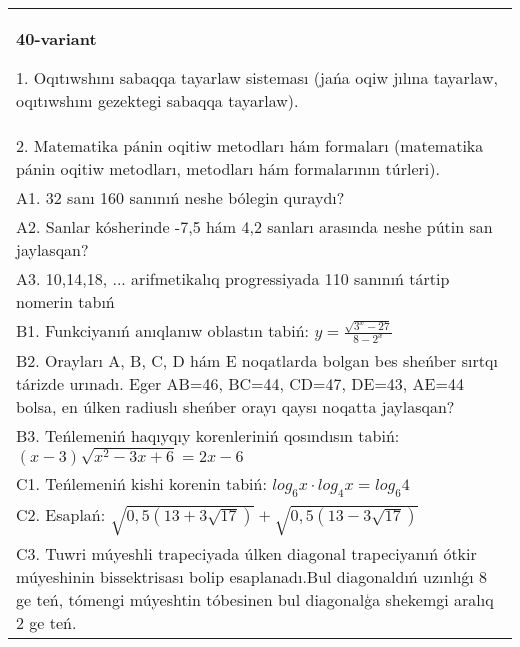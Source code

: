 \documentclass{article}
\begin{document}
\begin{tabular}{m{17cm}}
\textbf{40-variant}

1. Oqıtıwshını sabaqqa tayarlaw sisteması (jańa oqiw jılına tayarlaw, oqıtıwshını gezektegi sabaqqa tayarlaw). \\
2. Matematika pánin oqitiw metodları hám formaları (matematika pánin oqitiw metodları, metodları hám formalarının túrleri). \\
A1. 32 sanı 160 sanınıń neshe bólegin quraydı? \\
A2. Sanlar kósherinde -7,5 hám 4,2 sanları arasında neshe pútin san jaylasqan? \\
A3. 10,14,18, ... arifmetikalıq progressiyada 110 sanınıń tártip nomerin tabıń \\
B1. Funkciyanıń anıqlanıw oblastın tabiń: \(y = \frac{\sqrt{3^{x} - 27}}{8 - 2^{x}}\) \\
B2. Orayları A, B, C, D hám E noqatlarda bolgan bes sheńber sırtqı tárizde urınadı. Eger AB=46, BC=44, CD=47, DE=43, AE=44 bolsa, en úlken radiuslı sheńber orayı qaysı noqatta jaylasqan? \\
B3. Teńlemeniń haqıyqıy korenleriniń qosındısın tabiń: \((x-3) \sqrt{x^{2} - 3x + 6} = 2x - 6\) \\
C1. Teńlemeniń kishi korenin tabiń: \(log_{6}x \cdot log_{4}x = log_{6}4\) \\
C2. Esaplań: \(\sqrt{0,5 (13 + 3\sqrt{17}) } + \sqrt{0,5 (13 - 3\sqrt{17}) }\) \\
C3. Tuwri múyeshli trapeciyada úlken diagonal trapeciyanıń ótkir múyeshinin bissektrisası bolip esaplanadı.Bul diagonaldıń uzınlıǵı 8 ge teń, tómengi múyeshtin tóbesinen bul diagonalģa shekemgi aralıq 2 ge teń. \\

\end{tabular}
\vspace{1cm}
\end{document}
